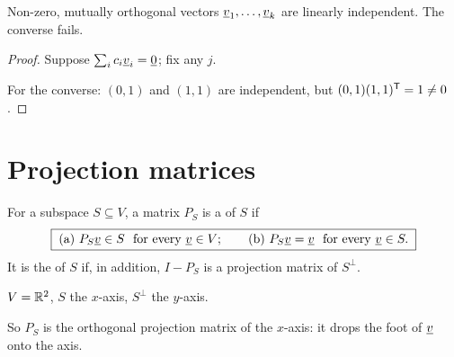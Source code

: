 \begin{result}
Non-zero, mutually orthogonal vectors $\underline{v}_1,\dots,\underline{v}_k$ are linearly independent. The converse fails.
\end{result}
\begin{proof}
Suppose $\sum_ic_i\underline{v}_i=\underline{0}$; fix any $j$.
\begin{deriv}
\end{deriv}
For the converse: $(0,1)$ and $(1,1)$ are independent, but $(0,1)(1,1)^{\mathsf{T}}=1\ne0$.
\end{proof}

\section{Projection matrices}

\begin{definition}
For a subspace $S\subseteq V$, a matrix $P_S$ is a  of $S$ if
\[
  \boxed{\;\text{(a) }P_S\vect{v}\in S\ \text{ for every }\vect{v}\in V;\qquad\text{(b) }P_S\vect{v}=\vect{v}\ \text{ for every }\vect{v}\in S.\;}
\]
It is the  of $S$ if, in addition, $I-P_S$ is a projection matrix of $S^\perp$.
\end{definition}

\begin{example}
$V=\mathbb{R}^2$, $S$ the $x$-axis, $S^\perp$ the $y$-axis.
\begin{deriv}
\end{deriv}
So $P_S$ is the orthogonal projection matrix of the $x$-axis: it drops the foot of $\underline{v}$ onto the axis.
\end{example}

